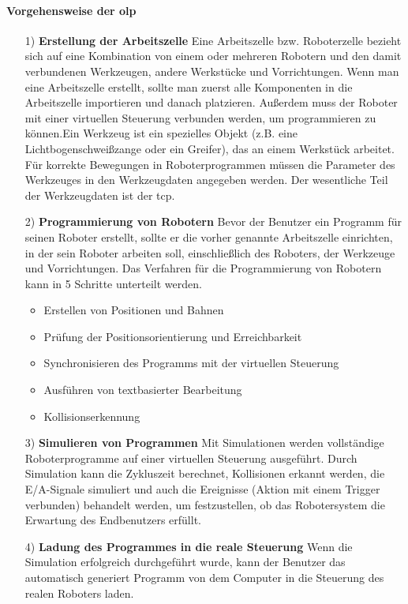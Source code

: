 \documentclass[14pt,a4paper,titlepage]{article}
\begin{document}
	\paragraph{Vorgehensweise der \acl{olp}}
	\begin{itemize}
		\item[1)]
		\textbf{Erstellung der Arbeitszelle}
		\linebreak
		Eine Arbeitszelle bzw. Roboterzelle bezieht sich auf eine Kombination von einem oder mehreren Robotern und den damit verbundenen Werkzeugen, andere Werkstücke und Vorrichtungen. Wenn man eine Arbeitszelle erstellt, sollte man zuerst alle Komponenten in die Arbeitszelle importieren und danach platzieren. Außerdem muss der Roboter mit einer virtuellen Steuerung verbunden werden, um programmieren zu können.Ein Werkzeug ist ein spezielles Objekt (z.B. eine Lichtbogenschweißzange oder
		ein Greifer), das an einem Werkstück arbeitet. Für korrekte Bewegungen in
		Roboterprogrammen müssen die Parameter des Werkzeuges in den Werkzeugdaten
		angegeben werden. Der wesentliche Teil der Werkzeugdaten ist der \acf{tcp}.
		
		\item[2)] 
		\textbf{Programmierung von Robotern}
		\linebreak
		 Bevor der Benutzer ein Programm für seinen Roboter erstellt, sollte er die vorher genannte Arbeitszelle
		 einrichten, in der sein Roboter arbeiten soll, einschließlich des Roboters, der Werkzeuge
		 und Vorrichtungen.
		 \bigbreak
		 Das Verfahren für die Programmierung von Robotern kann in 5 Schritte unterteilt werden.
		 \begin{itemize}
		 	\item Erstellen von Positionen
		 	und Bahnen
		 	\item Prüfung der Positionsorientierung und Erreichbarkeit
		 	\item Synchronisieren des Programms
		 	mit der virtuellen
		 	Steuerung
		 	\item Ausführen von textbasierter
		 	Bearbeitung
		 	\item Kollisionserkennung
		 \end{itemize} 
	 	\item[3)]
	 	\textbf{Simulieren von Programmen}
	 	\linebreak
	 	Mit Simulationen werden vollständige Roboterprogramme auf einer virtuellen Steuerung ausgeführt. Durch Simulation kann die Zykluszeit berechnet, Kollisionen erkannt werden, die E/A-Signale simuliert und auch die Ereignisse (Aktion mit einem Trigger verbunden) behandelt werden, um festzustellen, ob das Robotersystem die Erwartung des Endbenutzers erfüllt.
	 	
	 	\item [4)]
	 	\textbf{Ladung des Programmes in die reale Steuerung}
	 	\linebreak
	 	Wenn die Simulation erfolgreich durchgeführt wurde, kann der Benutzer das automatisch generiert Programm von dem Computer in die Steuerung des realen Roboters laden.   
	\end{itemize}
\end{document}
